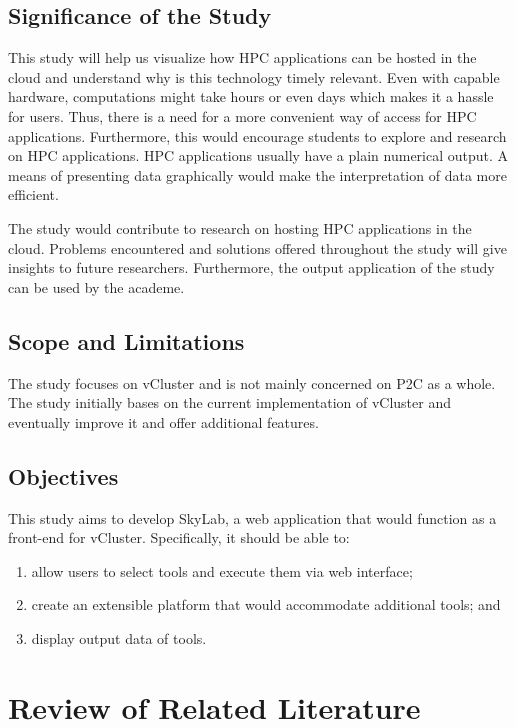     \subsection{Significance of the Study}
    This study will help us visualize how HPC applications can be hosted in the cloud and understand why is this technology timely relevant.  Even with capable hardware, computations might take hours or even days which makes it a hassle for users. Thus, there is a need for a more convenient way of access for HPC applications. Furthermore, this would encourage students to explore and research on HPC applications. HPC applications usually have a plain numerical output. A means of presenting data graphically would make the interpretation of data more efficient.

    The study would contribute to research on hosting HPC applications in the cloud. Problems encountered and solutions offered throughout the study will give insights to future researchers. Furthermore, the output application of the study can be used by the academe.

    \subsection{Scope and Limitations}
    The study focuses on vCluster and is not mainly concerned on P2C as a whole. The study initially bases on the current implementation of vCluster and eventually improve it and offer additional features\cite {Hermocilla2014}.

    \subsection{Objectives}
    This study aims to develop SkyLab, a web application that would function as a front-end for vCluster. %
	Specifically, it should be able to: 
	\begin{enumerate}
	
		\item allow users to select tools and execute them via web interface; 
        \item create an extensible platform that would accommodate additional tools; and
		\item display output data of tools.
	\end{enumerate}

\section {Review of Related Literature}
